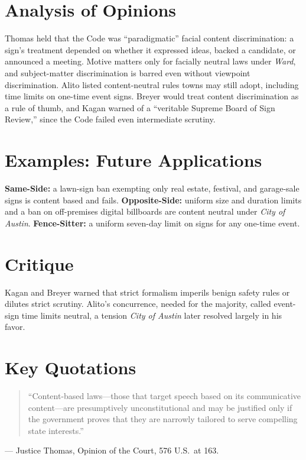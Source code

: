 \documentclass[12pt]{article}
\begin{document}
\section{Analysis of Opinions}
Thomas held that the Code was ``paradigmatic'' facial content discrimination: a sign's treatment depended on whether it expressed ideas, backed a candidate, or announced a meeting. Motive matters only for facially neutral laws under \textit{Ward}, and subject-matter discrimination is barred even without viewpoint discrimination. Alito listed content-neutral rules towns may still adopt, including time limits on one-time event signs. Breyer would treat content discrimination as a rule of thumb, and Kagan warned of a ``veritable Supreme Board of Sign Review,'' since the Code failed even intermediate scrutiny.

\section{Examples: Future Applications}
\textbf{Same-Side:} a lawn-sign ban exempting only real estate, festival, and garage-sale signs is content based and fails. \textbf{Opposite-Side:} uniform size and duration limits and a ban on off-premises digital billboards are content neutral under \textit{City of Austin}. \textbf{Fence-Sitter:} a uniform seven-day limit on signs for any one-time event.

\section{Critique}
Kagan and Breyer warned that strict formalism imperils benign safety rules or dilutes strict scrutiny. Alito's concurrence, needed for the majority, called event-sign time limits neutral, a tension \textit{City of Austin} later resolved largely in his favor.

\section{Key Quotations}
\begin{quote}\sloppy
``Content-based laws---those that target speech based on its communicative content---are presumptively unconstitutional and may be justified only if the government proves that they are narrowly tailored to serve compelling state interests.''
\end{quote}
\noindent --- Justice Thomas, Opinion of the Court, 576 U.S.\ at 163.
\end{document}
